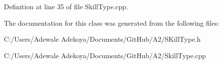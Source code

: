 Definition at line 35 of file Skill\+Type.\+cpp.



The documentation for this class was generated from the following files\+:\begin{DoxyCompactItemize}
\item 
C\+:/\+Users/\+Adewale Adekoya/\+Documents/\+Git\+Hub/\+A2/S\+Kill\+Type.\+h\item 
C\+:/\+Users/\+Adewale Adekoya/\+Documents/\+Git\+Hub/\+A2/Skill\+Type.\+cpp\end{DoxyCompactItemize}
